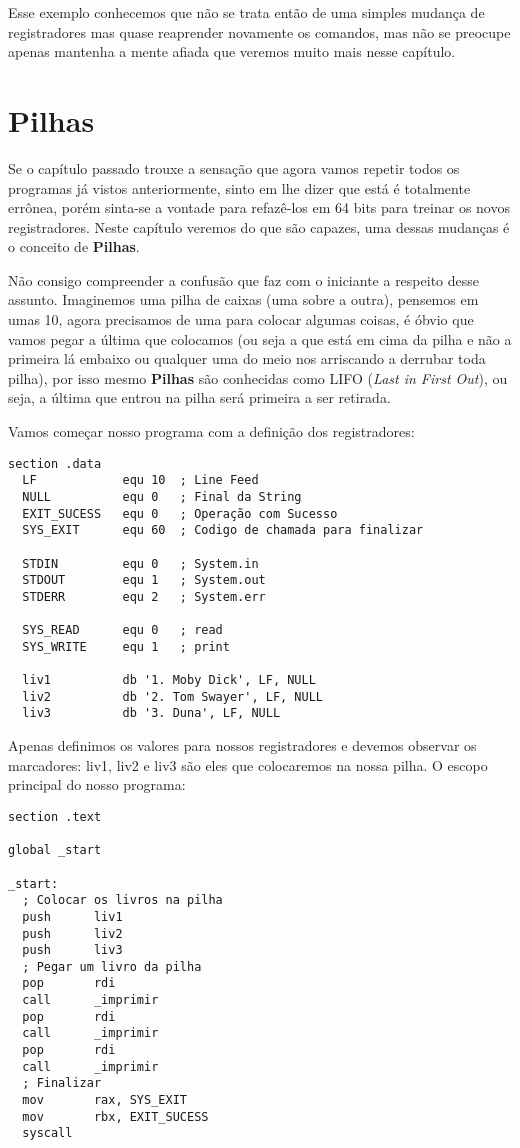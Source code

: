 Esse exemplo conhecemos que não se trata então de uma simples mudança de registradores mas quase reaprender novamente os comandos, mas não se preocupe apenas mantenha a mente afiada que veremos muito mais nesse capítulo.

\section{Pilhas}
Se o capítulo passado trouxe a sensação que agora vamos repetir todos os programas já vistos anteriormente, sinto em lhe dizer que está é totalmente errônea, porém sinta-se a vontade para refazê-los em 64 bits para treinar os novos registradores. Neste capítulo veremos do que são capazes, uma dessas mudanças é o conceito de \textbf{Pilhas}.

Não consigo compreender a confusão que faz com o iniciante a respeito desse assunto. Imaginemos uma pilha de caixas (uma sobre a outra), pensemos em umas 10, agora precisamos de uma para colocar algumas coisas, é óbvio que vamos pegar a última que colocamos (ou seja a que está em cima da pilha e não a primeira lá embaixo ou qualquer uma do meio nos arriscando a derrubar toda pilha), por isso mesmo \textbf{Pilhas} são conhecidas como LIFO (\textit{Last in First Out}), ou seja, a última que entrou na pilha será primeira a ser retirada.

Vamos começar nosso programa com a definição dos registradores:
\begin{lstlisting}[]
section .data
  LF            equ 10  ; Line Feed
  NULL          equ 0   ; Final da String
  EXIT_SUCESS   equ 0   ; Operação com Sucesso
  SYS_EXIT      equ 60  ; Codigo de chamada para finalizar

  STDIN         equ 0   ; System.in
  STDOUT        equ 1   ; System.out
  STDERR        equ 2   ; System.err

  SYS_READ      equ 0   ; read
  SYS_WRITE     equ 1   ; print

  liv1          db '1. Moby Dick', LF, NULL
  liv2          db '2. Tom Swayer', LF, NULL  
  liv3          db '3. Duna', LF, NULL
\end{lstlisting}

Apenas definimos os valores para nossos registradores e devemos observar os marcadores: liv1, liv2 e liv3 são eles que colocaremos na nossa pilha. O escopo principal do nosso programa:
\begin{lstlisting}[]
section .text

global _start

_start:
  ; Colocar os livros na pilha
  push      liv1
  push      liv2
  push      liv3
  ; Pegar um livro da pilha
  pop       rdi
  call      _imprimir
  pop       rdi
  call      _imprimir
  pop       rdi
  call      _imprimir
  ; Finalizar
  mov       rax, SYS_EXIT
  mov       rbx, EXIT_SUCESS
  syscall
\end{lstlisting}

